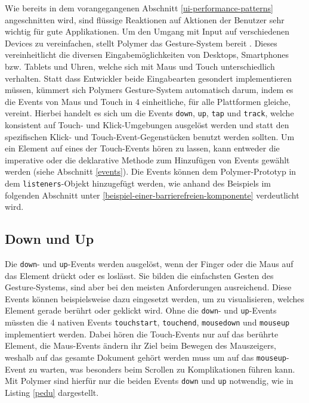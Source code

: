 Wie bereits in dem vorangegangenen Abschnitt \ref{ui-performance-patterns} angeschnitten wird, sind flüssige Reaktionen auf Aktionen der Benutzer sehr wichtig für gute Applikationen. Um den Umgang mit Input auf verschiedenen Devices zu vereinfachen, stellt Polymer das Gesture-System bereit \cite{citeulike:13915222}. Dieses vereinheitlicht die diversen Eingabemöglichkeiten von Desktops, Smartphones bzw. Tablets und Uhren, welche sich mit Maus und Touch unterschiedlich verhalten. Statt dass Entwickler beide Eingabearten gesondert implementieren müssen, kümmert sich Polymers Gesture-System automatisch darum, indem es die Events von Maus und Touch in 4 einheitliche, für alle Plattformen gleiche, vereint. Hierbei handelt es sich um die Events \texttt{down}, \texttt{up}, \texttt{tap} und \texttt{track}, welche konsistent auf Touch- und Klick-Umgebungen ausgelöst werden und statt den spezifischen Klick- und Touch-Event-Gegenstücken benutzt werden sollten. Um ein Element auf eines der Touch-Events hören zu lassen, kann entweder die imperative oder die deklarative Methode zum Hinzufügen von Events gewählt werden (siehe Abschnitt \ref{events}). Die Events können dem Polymer-Prototyp in dem \texttt{listeners}-Objekt hinzugefügt werden, wie anhand des Beispiels im folgenden Abschnitt unter \ref{beispiel-einer-barrierefreien-komponente} verdeutlicht wird.


\subsection{Down und Up}\label{down-und-up}

Die \texttt{down}- und \texttt{up}-Events werden ausgelöst, wenn der Finger oder die Maus auf das Element drückt oder es loslässt. Sie bilden die einfachsten Gesten des Gesture-Systems, sind aber bei den meisten Anforderungen ausreichend. Diese Events können beispielsweise dazu eingesetzt werden, um zu visualisieren, welches Element gerade berührt oder geklickt wird. Ohne die \texttt{down}- und \texttt{up}-Events müssten die 4 nativen Events \texttt{touchstart}, \texttt{touchend}, \texttt{mousedown} und \texttt{mouseup} implementiert werden. Dabei hören die Touch-Events nur auf das berührte Element, die Maus-Events ändern ihr Ziel beim Bewegen des Mauszeigers, weshalb auf das gesamte Dokument gehört werden muss um auf das \texttt{mouseup}-Event zu warten, was besonders beim Scrollen zu Komplikationen führen kann. Mit Polymer sind hierfür nur die beiden Events \texttt{down} und \texttt{up} notwendig, wie in Listing \ref{pedu} dargestellt.

